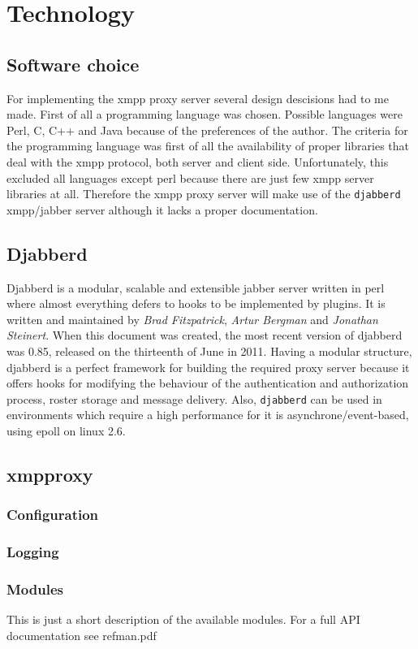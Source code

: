 \documentclass[a4paper,10pt,numbers=noendperiod]{scrartcl}
\begin{document}
\section{Technology}
\subsection{Software choice}
For implementing the xmpp proxy server several design descisions had to me made. First of all a programming language was chosen. Possible languages were Perl, C, C++ and Java because of the preferences of the author. The criteria for the programming language was first of all the availability of proper libraries that deal with the xmpp protocol, both server and client side.  Unfortunately, this excluded all languages except perl because there are just few xmpp server libraries at all. Therefore the xmpp proxy server will make use of the \texttt{djabberd} xmpp/jabber server although it lacks a proper documentation.
\subsection{Djabberd}
Djabberd is a modular, scalable and extensible jabber server written in perl where almost everything defers to hooks to be implemented by plugins. %
It is written and maintained by \textit{Brad Fitzpatrick}, \textit{Artur Bergman} and \textit{Jonathan Steinert}.
When this document was created, the most recent version of djabberd was 0.85, released on the thirteenth of June in 2011. Having a modular structure, djabberd is a perfect framework for building the required proxy server because it offers hooks for modifying the behaviour of the authentication and authorization process, roster storage and message delivery. Also, \texttt{djabberd} can be used in environments which require a high performance for it is asynchrone/event-based, using epoll on linux 2.6.
\subsection{xmpproxy}
\subsubsection{Configuration}
\subsubsection{Logging}
\subsubsection{Modules}
This is just a short description of the available modules. For a full API documentation see refman.pdf
\end{document}
